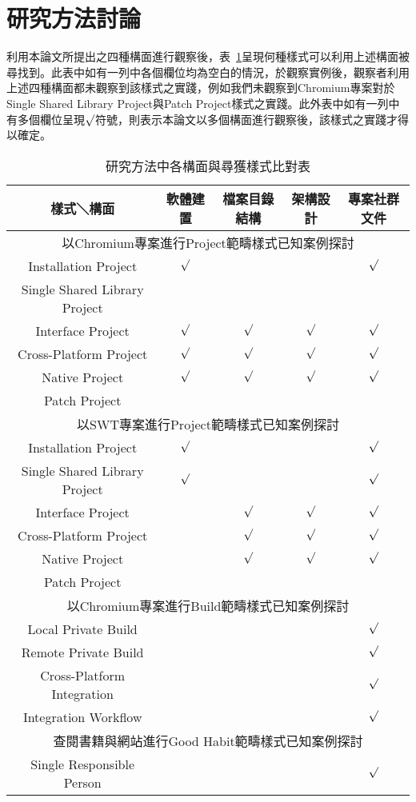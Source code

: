 \section{研究方法討論}

利用本論文所提出之四種構面進行觀察後，表~\ref{studymethodvsresult}呈現何種樣式可以利用上述構面被尋找到。此表中如有一列中各個欄位均為空白的情況，於觀察實例後，觀察者利用上述四種構面都未觀察到該樣式之實踐，例如我們未觀察到Chromium專案對於Single Shared Library Project與Patch Project樣式之實踐。此外表中如有一列中有多個欄位呈現${\surd}$符號，則表示本論文以多個構面進行觀察後，該樣式之實踐才得以確定。

\begin{table}[h]
\fontsize{10pt}{8pt}\selectfont
	\setlength{\abovecaptionskip}{0pt}
	\setlength{\belowcaptionskip}{10pt}
	\begin{center}
	\caption{研究方法中各構面與尋獲樣式比對表}\label{studymethodvsresult}
\begin{tabular}[width=\textwidth]{|c|c|c|c|c|}
\hline
樣式＼構面&軟體建置&檔案目錄結構&架構設計&專案社群文件\\
\hline
\multicolumn{5}{|c|}{以Chromium專案進行Project範疇樣式已知案例探討}\\
\hline
Installation Project&${\surd}$&&&${\surd}$\\
\hline
Single Shared Library Project&&&&\\
\hline
Interface Project&${\surd}$&${\surd}$&${\surd}$&${\surd}$\\
\hline
Cross-Platform Project&${\surd}$&${\surd}$&${\surd}$&${\surd}$\\
\hline
Native Project&${\surd}$&${\surd}$&${\surd}$&${\surd}$\\
\hline
Patch Project&&&&\\
\hline
\multicolumn{5}{|c|}{以SWT專案進行Project範疇樣式已知案例探討}\\
\hline
Installation Project&${\surd}$&&&${\surd}$\\
\hline
Single Shared Library Project&${\surd}$&&&${\surd}$\\
\hline
Interface Project&&${\surd}$&${\surd}$&${\surd}$\\
\hline
Cross-Platform Project&&${\surd}$&${\surd}$&${\surd}$\\
\hline
Native Project&&${\surd}$&${\surd}$&${\surd}$\\
\hline
Patch Project&&&&\\
\hline
\multicolumn{5}{|c|}{以Chromium專案進行Build範疇樣式已知案例探討}\\
\hline
Local Private Build&&&&${\surd}$\\
\hline
Remote Private Build&&&&${\surd}$\\
\hline
Cross-Platform Integration&&&&${\surd}$\\
\hline
Integration Workflow&&&&${\surd}$\\
\hline
\multicolumn{5}{|c|}{查閱書籍與網站進行Good Habit範疇樣式已知案例探討}\\
\hline
Single Responsible Person&&&&${\surd}$\\
\hline
\end{tabular}
\end{center}
\end{table}

